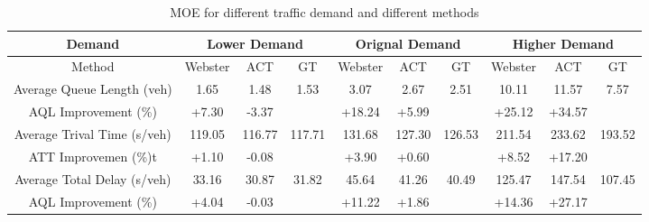 \documentclass[a4paper, 10pt, conference]{ieeeconf}      %
\begin{document}
\begin{table}[h]
        \caption{MOE for different traffic demand and different methods}
        \label{Tab:Res}
        \begin{center}
                \begin{tabular}{|c|c|c|c|c|c|c|c|c|c|}
                        \hline
                        Demand&\multicolumn{3}{c|}{Lower Demand}&\multicolumn{3}{c|}{Orignal Demand}&\multicolumn{3}{c|}{Higher Demand}\\
                        \hline
                        Method&Webster&ACT&GT&Webster&ACT&GT&Webster&ACT&GT\\
                        \hline
                        Average Queue Length (veh)&1.65&1.48&1.53&3.07&2.67&2.51&10.11&11.57&7.57\\
                        \hline
                        AQL Improvement (\%)&+7.30&-3.37&&+18.24&+5.99&&+25.12&+34.57&\\
                        \hline
                        Average Trival Time (s/veh)&119.05&116.77&117.71&131.68&127.30&126.53&211.54&233.62&193.52\\
                        \hline
                        ATT Improvemen (\%)t&+1.10&-0.08&&+3.90&+0.60&&+8.52&+17.20&\\
                        \hline
                        Average Total Delay (s/veh)&33.16&30.87&31.82&45.64&41.26&40.49&125.47&147.54&107.45\\
                        \hline
                        AQL Improvement (\%)&+4.04&-0.03&&+11.22&+1.86&&+14.36&+27.17&\\
                        \hline
                \end{tabular}
        \end{center}
\end{table}
\end{document}
